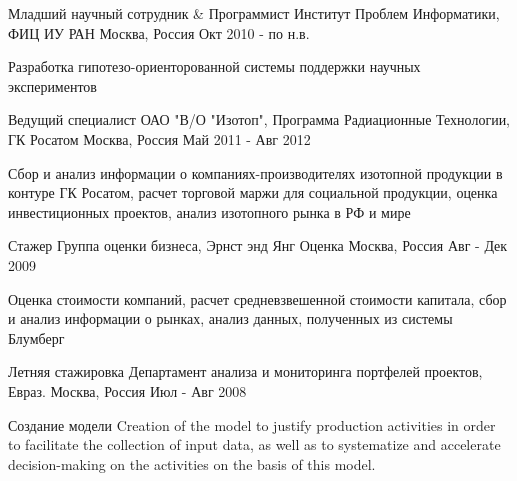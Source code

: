 \begin{cventries}
\cventry
    {Младший научный сотрудник \& Программист}
    {Институт Проблем Информатики, ФИЦ ИУ РАН}
    {Москва, Россия}
    {Окт 2010 - по н.в.}
    {
      \begin{cvitems}
       \item {Разработка гипотезо-ориенторованной системы поддержки научных экспериментов}
      \end{cvitems}
    }
  \cventry
    {Ведущий специалист}
    {ОАО "В/О "Изотоп", Программа Радиационные Технологии, ГК Росатом}
    {Москва, Россия}
    {Май 2011 - Авг 2012}
    {
      \begin{cvitems}
        \item {Сбор и анализ информации о компаниях-производителях изотопной продукции в контуре ГК Росатом, расчет торговой маржи для социальной продукции, оценка инвестиционных проектов, анализ изотопного рынка в РФ и мире}
      \end{cvitems}
    }
 
 \cventry
    {Стажер}
    {Группа оценки бизнеса, Эрнст энд Янг Оценка}
    {Москва, Россия}
    {Авг - Дек 2009}
    {
      \begin{cvitems}
        \item {Оценка стоимости компаний, расчет средневзвешенной стоимости капитала, сбор и анализ информации о рынках, анализ данных, полученных из системы Блумберг}
      \end{cvitems}
    }
     \cventry
    {Летняя стажировка}
    {Департамент анализа и мониторинга портфелей проектов, Евраз.}
    {Москва, Россия}
    {Июл - Авг 2008}
    {
      \begin{cvitems}
        \item {Создание модели Creation of the model to justify production activities in order to facilitate the collection of input data, as well as to systematize and accelerate decision-making on the activities on the basis of this model.}
      \end{cvitems}
    }


\end{cventries}
